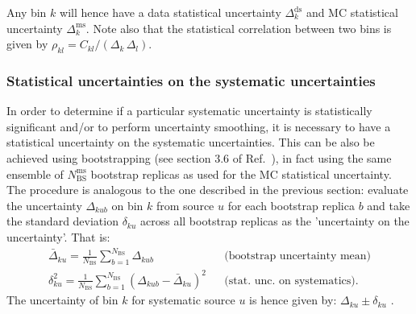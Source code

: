 Any bin $k$ will hence have a data statistical uncertainty $\Delta_k^\mathrm{ds}$ and MC statistical uncertainty $\Delta_k^\mathrm{ms}$.
Note also that the statistical correlation between two bins is given by $\rho_{kl} = C_{kl}/(\Delta_k\,\Delta_l).$




\subsubsection{Statistical uncertainties on the systematic uncertainties}
\label{sec:uncertaintyuncertainty}

In order to determine if a particular systematic uncertainty is statistically significant and/or to perform uncertainty smoothing, it is necessary to have a statistical uncertainty on the systematic uncertainties. This can be also be achieved using bootstrapping (see section 3.6 of Ref.~\cite{ATLAS-bootstrap}), in fact using the same ensemble of $N_\mathrm{BS}^\mathrm{ms}$ bootstrap replicas as used for the MC statistical uncertainty. The procedure is analogous to the one described in the previous section: evaluate the uncertainty $\Delta_{kub}$ on bin $k$ from source $u$ for each bootstrap replica $b$ and take the standard deviation $\delta_{ku}$ across all bootstrap replicas as the 'uncertainty on the uncertainty'. That is:
\begin{eqnarray}
  \label{eq:unc-on-unc}
  \bar{\Delta}_{ku} = \frac{1}{N_\mathrm{BS}}\sum_{b=1}^{N_\mathrm{BS}} \Delta_{kub} 
  & & \text{(bootstrap uncertainty mean)}\\
  \delta_{ku}^2 = \frac{1}{N_\mathrm{BS}}\sum_{b=1}^{N_\mathrm{BS}} \left(\Delta_{kub} - \bar{\Delta}_{ku}\right)^2 
  & & \text{(stat.~unc.~on systematics)}.
\end{eqnarray}
The uncertainty of bin $k$ for systematic source $u$ is hence given by: $\Delta_{ku} \pm \delta_{ku}$ .

